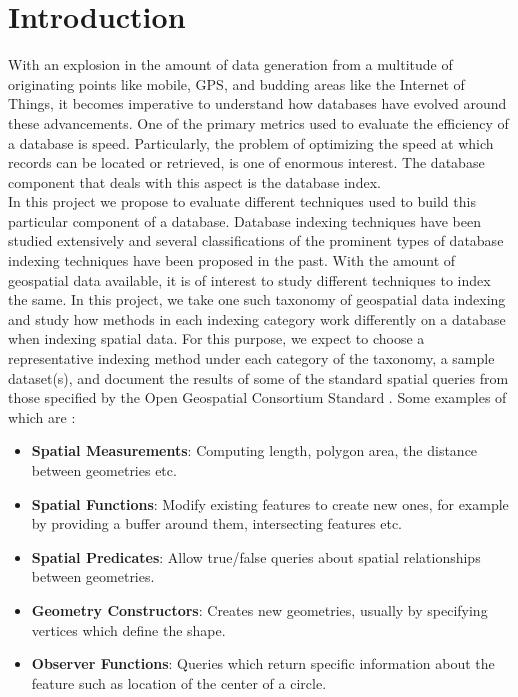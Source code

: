 \documentclass{sig-alternate-05-2015}
\begin{document}
%
%

%
%

%
%



\section{Introduction}
With an explosion in the amount of data generation from a multitude of originating points like mobile, GPS, and budding areas like the Internet of Things, it becomes imperative to understand how databases have evolved around these advancements. One of the primary metrics used to evaluate the efficiency of a database is speed. Particularly, the problem of optimizing the speed at which records can be located or retrieved, is one of enormous interest. The database component that deals with this aspect is the database index.\\

In this project we propose to evaluate different techniques used to build this particular component of a database. Database indexing techniques have been studied extensively and several classifications of the prominent types of database indexing techniques have been proposed in the past. With the amount of geospatial data available, it is of interest to study different techniques to index the same. In this project, we take one such taxonomy of geospatial data indexing and study how methods in each indexing category work differently on a database when indexing spatial data. For this purpose, we expect to choose a representative indexing method under each category of the taxonomy, a sample dataset(s), and document the results of some of the standard spatial queries from those specified by the Open Geospatial Consortium Standard \cite{ogc}. Some examples of which are \cite{wiki:spatial}:
\begin{itemize}
\item \textbf{Spatial Measurements}: Computing length, polygon area, the distance between geometries etc.
\item \textbf{Spatial Functions}: Modify existing features to create new ones, for example by providing a buffer around them, intersecting features etc.
\item \textbf{Spatial Predicates}: Allow true/false queries about spatial relationships between geometries.
\item \textbf{Geometry Constructors}: Creates new geometries, usually by specifying vertices which define the shape.
\item \textbf{Observer Functions}: Queries which return specific information about the feature such as location of the center of a circle.
\end{itemize}
\end{document}
